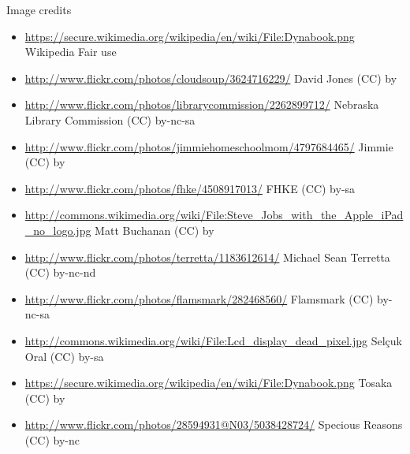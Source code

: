 \begin{frame}[plain]
  Image credits
  \tiny
  \begin{itemize}
    \item \url{https://secure.wikimedia.org/wikipedia/en/wiki/File:Dynabook.png} Wikipedia Fair use
    \item \url{http://www.flickr.com/photos/cloudsoup/3624716229/} David Jones (CC) by
    \item \url{http://www.flickr.com/photos/librarycommission/2262899712/} Nebraska Library Commission (CC) by-nc-sa
    \item \url{http://www.flickr.com/photos/jimmiehomeschoolmom/4797684465/} Jimmie (CC) by
    \item \url{http://www.flickr.com/photos/fhke/4508917013/} FHKE (CC) by-sa
    \item \url{http://commons.wikimedia.org/wiki/File:Steve_Jobs_with_the_Apple_iPad_no_logo.jpg} Matt Buchanan (CC) by
    \item \url{http://www.flickr.com/photos/terretta/1183612614/} Michael Sean Terretta (CC) by-nc-nd
    \item \url{http://www.flickr.com/photos/flamsmark/282468560/} Flamsmark (CC) by-nc-sa
    \item \url{http://commons.wikimedia.org/wiki/File:Lcd_display_dead_pixel.jpg} Selçuk Oral (CC) by-sa
    \item \url{https://secure.wikimedia.org/wikipedia/en/wiki/File:Dynabook.png} Tosaka (CC) by
    \item \url{http://www.flickr.com/photos/28594931@N03/5038428724/} Specious Reasons (CC) by-nc
  \end{itemize}
\end{frame}
